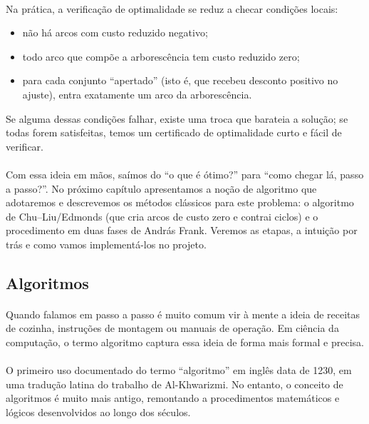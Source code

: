 \documentclass[12pt,a4paper]{article}
\def\emph#1{#1}%
\begin{document}
\paragraph{}
Na prática, a verificação de optimalidade se reduz a checar condições locais:
\begin{itemize}\setlength{\itemsep}{2pt}
    \item não há arcos com custo reduzido negativo;
    \item todo arco que compõe a arborescência tem custo reduzido zero;
    \item para cada conjunto “apertado” (isto é, que recebeu desconto positivo no ajuste), entra exatamente um arco da arborescência.
\end{itemize}
Se alguma dessas condições falhar, existe uma troca que barateia a solução; se todas forem satisfeitas, temos um certificado de optimalidade curto e fácil de verificar.

\paragraph{}
Com essa ideia em mãos, saímos do “o que é ótimo?” para “como chegar lá, passo a passo?”. No próximo capítulo apresentamos a noção de algoritmo que adotaremos e descrevemos os métodos clássicos para este problema: o algoritmo de Chu–Liu/Edmonds (que cria arcos de custo zero e contrai ciclos) e o procedimento em duas fases de András Frank. Veremos as etapas, a intuição por trás e como vamos implementá-los no projeto.

\subsection{Algoritmos}
\paragraph{}
Quando falamos em passo a passo é muito comum vir à mente a ideia de receitas de cozinha, instruções de montagem ou manuais de operação. Em ciência da computação, o termo \emph{algoritmo} captura essa ideia de forma mais formal e precisa.

\paragraph{}O primeiro uso documentado do termo “algoritmo” em inglês data de 1230, em uma tradução latina do trabalho de Al-Khwarizmi. No entanto, o conceito de algoritmos é muito mais antigo, remontando a procedimentos matemáticos e lógicos desenvolvidos ao longo dos séculos.
\end{document}
